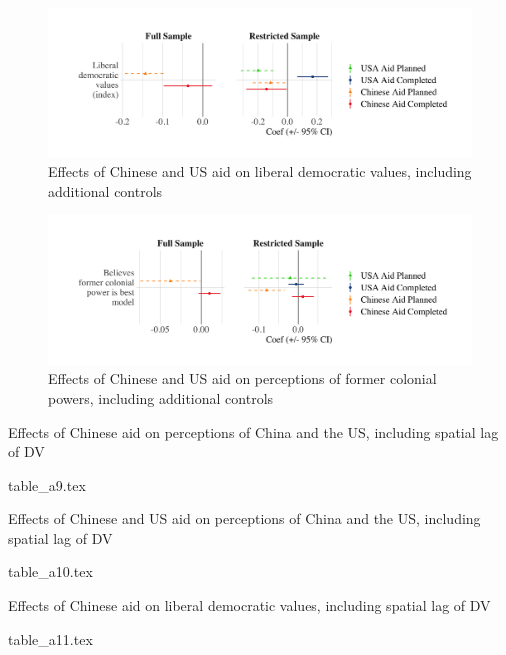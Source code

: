 \documentclass[9pt]{article}
\begin{document}
\begin{figure}[H]
\centering
\includegraphics[width=1\textwidth]{figures/figure_a14.png}
\caption{Effects of Chinese and US aid on liberal democratic values, including additional controls}
\end{figure}

\begin{figure}[H]
\centering
\includegraphics[width=1\textwidth]{figures/figure_a15.png}
\caption{Effects of Chinese and US aid on perceptions of former colonial powers, including additional controls}
\end{figure}

\newpage %

\setlength{\tabcolsep}{5pt}
\begin{table}[H]
\caption{Effects of Chinese aid on perceptions of China and the US, including spatial lag of DV}
\label{reg}
\centering
{table_a9.tex}
\end{table}

\setlength{\tabcolsep}{5pt}
\begin{table}[H]
\caption{Effects of Chinese and US aid on perceptions of China and the US, including spatial lag of DV}
\label{reg}
\centering
{table_a10.tex}
\end{table}

\newpage %

\setlength{\tabcolsep}{5pt}
\begin{table}[H]
\caption{Effects of Chinese aid on liberal democratic values, including spatial lag of DV}
\label{reg}
\centering
{table_a11.tex}
\end{table}
\end{document}
